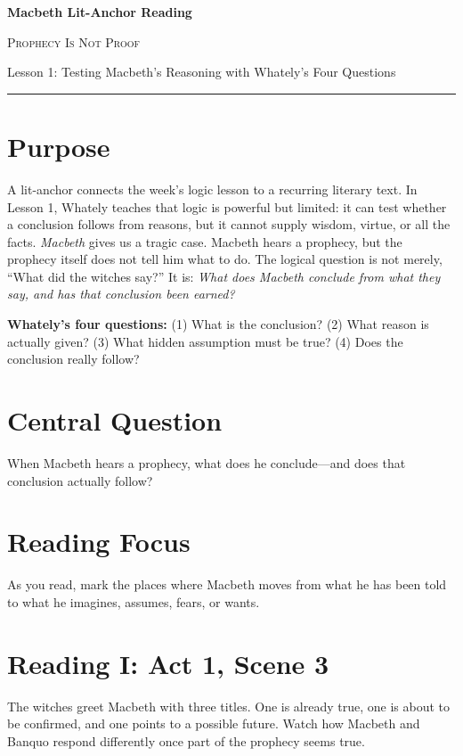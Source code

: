 \documentclass[12pt]{article}
\newcommand{\focusbox}[1]{\par\vspace{0.35em}\noindent\begingroup\setlength{\fboxsep}{6pt}\colorbox{gray!12}{\begin{minipage}{\dimexpr\linewidth-2\fboxsep\relax}#1\end{minipage}}\endgroup\par\vspace{0.45em}}
\begin{document}
\begin{center}
{\LARGE\bfseries Macbeth Lit-Anchor Reading}\par\vspace{0.18em}
{\large\scshape Prophecy Is Not Proof}\par\vspace{0.35em}
{Lesson 1: Testing Macbeth's Reasoning with Whately's Four Questions}\par\vspace{0.55em}
\rule{0.82\textwidth}{0.4pt}
\end{center}

\section*{Purpose}
A lit-anchor connects the week's logic lesson to a recurring literary text. In Lesson 1, Whately teaches that logic is powerful but limited: it can test whether a conclusion follows from reasons, but it cannot supply wisdom, virtue, or all the facts. \textit{Macbeth} gives us a tragic case. Macbeth hears a prophecy, but the prophecy itself does not tell him what to do. The logical question is not merely, ``What did the witches say?'' It is: \textit{What does Macbeth conclude from what they say, and has that conclusion been earned?}

\focusbox{\textbf{Whately's four questions:} (1) What is the conclusion? (2) What reason is actually given? (3) What hidden assumption must be true? (4) Does the conclusion really follow?}

\section*{Central Question}
When Macbeth hears a prophecy, what does he conclude---and does that conclusion actually follow?

\section*{Reading Focus}
As you read, mark the places where Macbeth moves from what he has been told to what he imagines, assumes, fears, or wants.

\section*{Reading I: Act 1, Scene 3}
The witches greet Macbeth with three titles. One is already true, one is about to be confirmed, and one points to a possible future. Watch how Macbeth and Banquo respond differently once part of the prophecy seems true.
\end{document}
